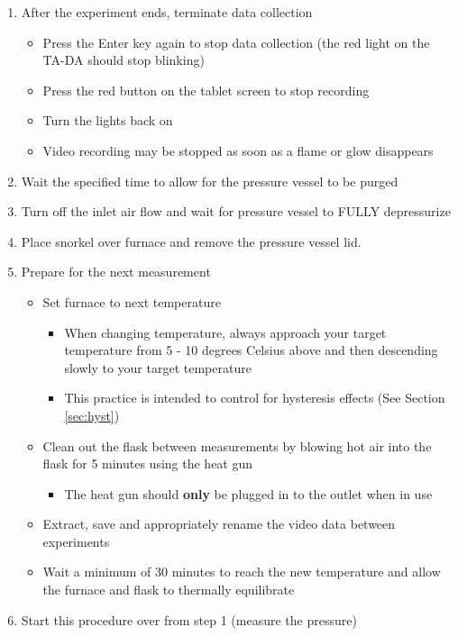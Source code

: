 \documentclass[letterpaper,11pt]{article}
\begin{document}
\begin{enumerate}
    \item After the experiment ends, terminate data collection
        \begin{itemize}
        \item Press the Enter key  again to stop data 
            collection (the red light on the TA-DA should stop blinking)
        \item Press the red button on the tablet screen to stop recording
        \item Turn the lights back on
        \item Video recording may be stopped as soon as a flame or glow
            disappears
        \end{itemize}
	
	\item Wait the specified time to allow for the pressure vessel to be purged
	
	\item Turn off the inlet air flow and wait for pressure vessel to FULLY depressurize
	
	\item Place snorkel over furnace and remove the pressure vessel lid.
	
    \item Prepare for the next measurement
        \begin{itemize}
        \item Set furnace to next temperature
            \begin{itemize}
            \item When changing temperature, always approach your target
                temperature from 5 - 10 degrees Celsius above and then 
                descending slowly to your target temperature
            \item This practice is intended to control for hysteresis effects
                (See Section \ref{sec:hyst})
            \end{itemize}
        \item Clean out the flask between measurements by blowing hot air into
            the flask for 5 minutes using the heat gun
            \begin{itemize}
            \item The heat gun should \textbf{only} be plugged in to the outlet 
                when in use
            \end{itemize}

        \item Extract, save and appropriately rename the video data between 
            experiments
        \item Wait a minimum of 30 minutes to reach the new temperature and 
            allow the furnace and flask to thermally equilibrate
        \end{itemize}
    
    \item Start this procedure over from step 1 (measure the pressure)
    \end{enumerate}
    
\end{document}
